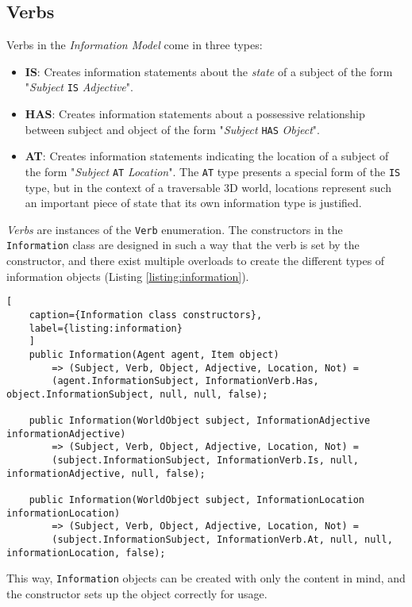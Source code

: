 \subsection{Verbs}
Verbs in the \textit{Information Model} come in three types:
\begin{itemize}
	\item \textbf{IS}: Creates information statements about the \textit{state} of a subject of the form "\textit{Subject} \verb|IS| \textit{Adjective}".
	\item \textbf{HAS}: Creates information statements about a possessive relationship between subject and object of the form "\textit{Subject} \verb|HAS| \textit{Object}".
	\item \textbf{AT}: Creates information statements indicating the location of a subject of the form "\textit{Subject} \verb|AT| \textit{Location}". The \verb|AT| type presents a special form of the \verb|IS| type, but in the context of a traversable 3D world, locations represent such an important piece of state that its own information type is justified.
\end{itemize}
\textit{Verbs} are instances of the \verb|Verb| enumeration. The constructors in the \verb|Information| class are designed in such a way that the verb is set by the constructor, and there exist multiple overloads to create the different types of information objects (Listing \ref{listing:information}).
\begin{lstlisting}[
	caption={Information class constructors},
	label={listing:information}
	]
	public Information(Agent agent, Item object)
		=> (Subject, Verb, Object, Adjective, Location, Not) =
		(agent.InformationSubject, InformationVerb.Has, object.InformationSubject, null, null, false);
	
	public Information(WorldObject subject, InformationAdjective informationAdjective)
		=> (Subject, Verb, Object, Adjective, Location, Not) =
		(subject.InformationSubject, InformationVerb.Is, null, informationAdjective, null, false);
	
	public Information(WorldObject subject, InformationLocation informationLocation)
		=> (Subject, Verb, Object, Adjective, Location, Not) =
		(subject.InformationSubject, InformationVerb.At, null, null, informationLocation, false);
\end{lstlisting}
This way, \verb|Information| objects can be created with only the content in mind, and the constructor sets up the object correctly for usage.
